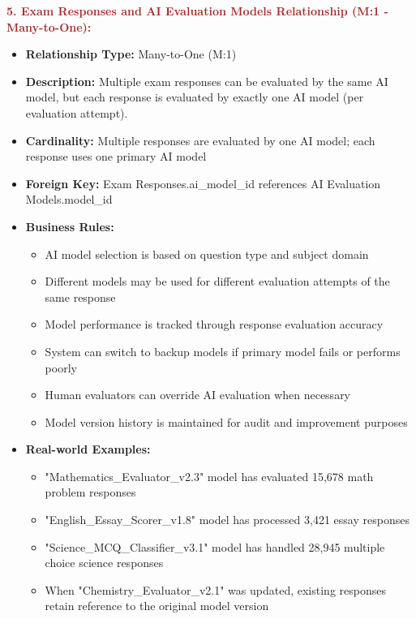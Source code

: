 \documentclass[12pt,a4paper,oneside]{book}
\begin{document}
\textbf{\textcolor{brown}{5. Exam Responses and AI Evaluation Models Relationship (M:1 - Many-to-One):}}
\begin{itemize}
    \item \textbf{Relationship Type:} Many-to-One (M:1)
    \item \textbf{Description:} Multiple exam responses can be evaluated by the same AI model, but each response is evaluated by exactly one AI model (per evaluation attempt).
    \item \textbf{Cardinality:} Multiple responses are evaluated by one AI model; each response uses one primary AI model
    \item \textbf{Foreign Key:} Exam Responses.ai\_model\_id references AI Evaluation Models.model\_id
    \item \textbf{Business Rules:}
        \begin{itemize}
            \item AI model selection is based on question type and subject domain
            \item Different models may be used for different evaluation attempts of the same response
            \item Model performance is tracked through response evaluation accuracy
            \item System can switch to backup models if primary model fails or performs poorly
            \item Human evaluators can override AI evaluation when necessary
            \item Model version history is maintained for audit and improvement purposes
        \end{itemize}
    \item \textbf{Real-world Examples:}
        \begin{itemize}
            \item "Mathematics\_Evaluator\_v2.3" model has evaluated 15,678 math problem responses
            \item "English\_Essay\_Scorer\_v1.8" model has processed 3,421 essay responses
            \item "Science\_MCQ\_Classifier\_v3.1" model has handled 28,945 multiple choice science responses
            \item When "Chemistry\_Evaluator\_v2.1" was updated, existing responses retain reference to the original model version
        \end{itemize}
\end{itemize}
\end{document}

